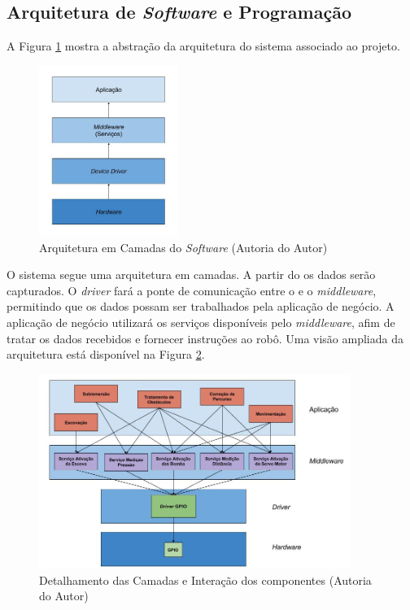 \subsection{Arquitetura de \textit{Software} e Programação}
A Figura \ref{fig:schema-arch} mostra a abstração da arquitetura do sistema associado ao projeto.
\par
\begin{figure}[h]
  \centering
  \includegraphics[width=0.4\textwidth]{figures/schema-arch.jpg}
  \caption{Arquitetura em Camadas do \textit{Software} (\textsf{Autoria do Autor})}
  \label{fig:schema-arch}
\end{figure}
\FloatBarrier
\par
O sistema segue uma arquitetura em camadas. A partir do \hardware os dados serão
capturados. O \textit{driver} fará a ponte de comunicação entre o \hardware
e o \textit{middleware}, permitindo que os dados possam ser trabalhados pela aplicação de
negócio. A aplicação de negócio utilizará os serviços disponíveis pelo \textit{middleware},
afim de tratar os dados recebidos e fornecer instruções ao robô. Uma visão
ampliada da arquitetura está disponível na Figura \ref{fig:schema-layer-arch}.
\par
\begin{figure}[h]
  \centering
  \includegraphics[width=0.9\textwidth]{figures/schema-layer-arch.jpg}
  \caption{Detalhamento das Camadas e Interação dos componentes (\textsf{Autoria do Autor})}
  \label{fig:schema-layer-arch}
\end{figure}
